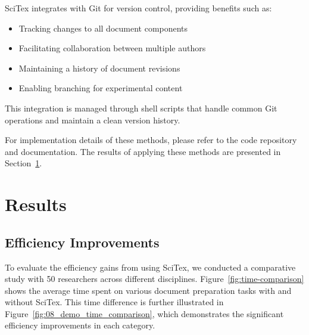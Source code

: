 \documentclass[preprint,review,12pt]{elsarticle}%
\begin{document}
\begin{frontmatter}
SciTex integrates with Git for version control, providing benefits such as:

\begin{itemize}
    \item Tracking changes to all document components
    \item Facilitating collaboration between multiple authors
    \item Maintaining a history of document revisions
    \item Enabling branching for experimental content
\end{itemize}

This integration is managed through shell scripts that handle common Git operations and maintain a clean version history.


For implementation details of these methods, please refer to the code repository and documentation. The results of applying these methods are presented in Section~\ref{sec:results}.


\section{Results}
\label{sec:results}


\subsection{Efficiency Improvements}
\label{subsec:efficiency}

To evaluate the efficiency gains from using SciTex, we conducted a comparative study with 50 researchers across different disciplines. Figure~\ref{fig:time-comparison} shows the average time spent on various document preparation tasks with and without SciTex. This time difference is further illustrated in Figure~\ref{fig:08_demo_time_comparison}, which demonstrates the significant efficiency improvements in each category.


\end{frontmatter}
\end{document}
